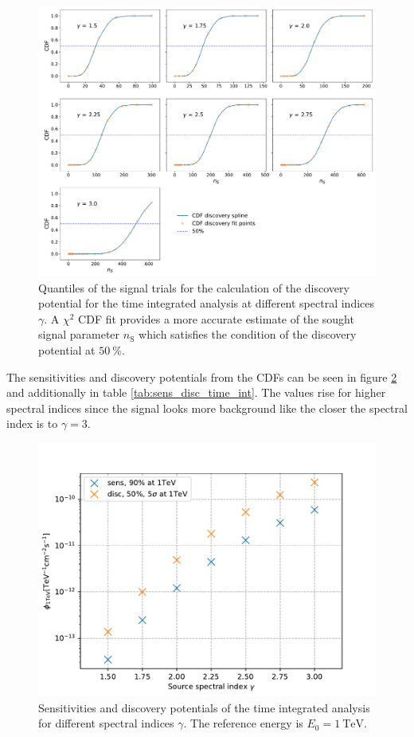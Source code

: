 \begin{figure}
    \centering
    \includegraphics[width=\linewidth]{Plots/05_csky/9_years_gfu_gold_cdf_disc.pdf}
    \caption{Quantiles of the signal trials for the calculation of the discovery potential for the time integrated analysis at different spectral indices $\gamma$. A $\chi^2$ CDF fit provides a more accurate estimate of the sought signal parameter $n_\text{S}$ which satisfies the condition of the discovery potential at $\SI{50}{\percent}$.}
    \label{fig:cdf_disc}
\end{figure}
The sensitivities and discovery potentials from the CDFs can be seen in figure \ref{fig:sens_disc_time_int} and additionally in table \ref{tab:sens_disc_time_int}.
The values rise for higher spectral indices since the signal looks more background like the closer the spectral index is to $\gamma = 3$.
\begin{figure}
    \centering
    \includegraphics[width=\linewidth]{Plots/05_csky/time_int_sens_gfu_gold_9_years_new.pdf}
    \caption{Sensitivities and discovery potentials of the time integrated analysis for different spectral indices $\gamma$. The reference energy is $E_0 = \SI{1}{\tera\electronvolt}$.}
    \label{fig:sens_disc_time_int}
\end{figure}

